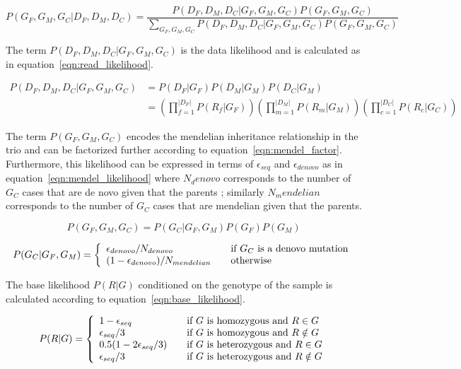 \documentclass{article}
\begin{document}
\begin{equation}\label{eqn:model}
P(G_F,G_M,G_C|D_F,D_M,D_C) =  \frac{P(D_F,D_M,D_C|G_F,G_M,G_C)P(G_F,G_M,G_C)}{\sum_{G_F,G_M,G_C}P(D_F,D_M,D_C|G_F,G_M,G_C)P(G_F,G_M,G_C)}
\end{equation}

The term $P(D_F,D_M,D_C|G_F,G_M,G_C)$ is the data likelihood and is calculated as in equation~\ref{eqn:read_likelihood}. 

\begin{align}\label{eqn:read_likelihood}
P(D_F,D_M,D_C|G_F,G_M,G_C) &= P(D_F|G_F)P(D_M|G_M)P(D_C|G_M) \\
	&= \left(\prod_{f=1}^{|D_F|}P(R_f|G_F)\right)\left(\prod_{m=1}^{|D_M|}P(R_m|G_M)\right)\left(\prod_{c=1}^{|D_C|}P(R_c|G_C)\right)
\end{align}

The term $P(G_F,G_M,G_C)$ encodes the mendelian inheritance relationship in the trio and can be factorized further according to equation~\ref{eqn:mendel_factor}. Furthermore, this likelihood can be expressed in terms of $\epsilon_{seq}$ and $\epsilon_{denovo}$ as in equation~\ref{eqn:mendel_likelihood} where $N_denovo$ corresponds to the number of $G_C$ cases that are de novo given that the parents ; similarly $N_mendelian$ corresponds to the number of $G_C$ cases that are mendelian given that the parents.

\begin{equation}\label{eqn:mendel_factor}
P(G_F,G_M,G_C) = P(G_C|G_F,G_M)P(G_F)P(G_M)
\end{equation}

\begin{equation}
\label{eqn:mendel_likelihood}
 P(G_C|G_F,G_M) = \left\{ 
  \begin{array}{l l}
    \epsilon_{denovo}/N_{denovo} & \quad \text{if $G_C$ is a denovo mutation}\\
    (1-\epsilon_{denovo})/N_{mendelian} & \quad \text{otherwise}
  \end{array} \right.
\end{equation}

\vspace{1em}
The base likelihood $P(R|G)$ conditioned on the genotype of the sample is calculated according to equation~\ref{eqn:base_likelihood}.

\begin{equation}
\label{eqn:base_likelihood}
P(R|G) = \left\{ 
  \begin{array}{l l}
    1-\epsilon_{seq} & \quad \text{if $G$ is homozygous and $R \in G$}\\
    \epsilon_{seq}/3 & \quad \text{if $G$ is homozygous and $R \notin G$}\\    
      0.5(1-2\epsilon_{seq}/3) & \quad \text{if $G$ is heterozygous and $R \in G$}\\
    \epsilon_{seq}/3 & \quad \text{if $G$ is heterozygous and $R \notin G$}
  \end{array} \right.
\end{equation}
  
\end{document}
